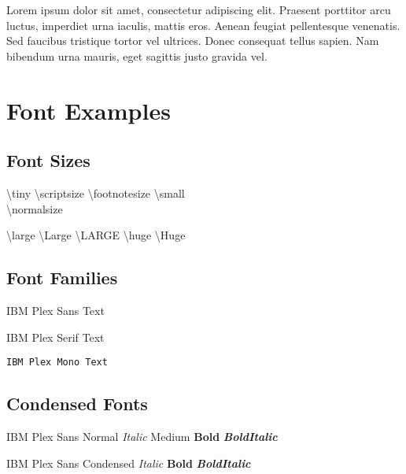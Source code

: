 \documentclass[a4paper]{CSMakotoTechnicalReport}
\begin{document}
\begin{multicols}{2}
    Lorem ipsum dolor sit amet, consectetur adipiscing elit. Praesent porttitor arcu luctus, imperdiet urna iaculis, mattis eros. Aenean feugiat pellentesque venenatis. Sed faucibus tristique tortor vel ultrices. Donec consequat tellus sapien. Nam bibendum urna mauris, eget sagittis justo gravida vel.


    \section{Font Examples}

    \subsection{Font Sizes}

    {\tiny \textbackslash tiny} {\scriptsize \textbackslash scriptsize} {\footnotesize \textbackslash footnotesize} {\small \textbackslash small}\\
    {\normalsize \textbackslash normalsize}\\
    {\raggedright {\large \textbackslash large} {\Large \textbackslash Large} {\LARGE \textbackslash LARGE} {\huge \textbackslash huge} {\Huge \textbackslash Huge}\par}

    \subsection{Font Families}

    \textsf{IBM Plex Sans Text}

    \textrm{IBM Plex Serif Text}

    \texttt{IBM Plex Mono Text}

    \subsection{Condensed Fonts}

    IBM Plex Sans Normal \textit{Italic} {\plexsansmedium Medium} \textbf{Bold} \textit{\textbf{BoldItalic}}

    {\plexsanscondensed IBM Plex Sans Condensed \textit{Italic} \textbf{Bold} \textit{\textbf{BoldItalic}}}



\end{multicols}
\end{document}
